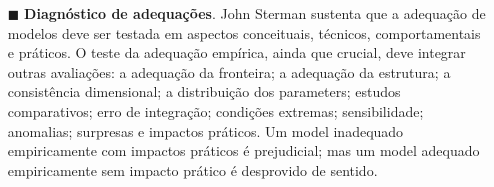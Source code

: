 \documentclass[./main.tex]{subfiles}
\begin{document}
\begin{itemize}
    \item[$\blacksquare$] \textbf{Diagnóstico de adequações}. John Sterman sustenta que a adequação de modelos deve ser testada em aspectos conceituais, técnicos, comportamentais e práticos. O teste da adequação empírica, ainda que crucial, deve integrar outras avaliações: a adequação da fronteira; a adequação da estrutura; a consistência dimensional; a distribuição dos \gls{parameters}; estudos comparativos; erro de integração; condições extremas; sensibilidade; anomalias; surpresas e impactos práticos. Um \gls{model} inadequado empiricamente com impactos práticos é prejudicial; mas um \gls{model} adequado empiricamente sem impacto prático é desprovido de sentido.
    
\end{itemize}
\end{document}
